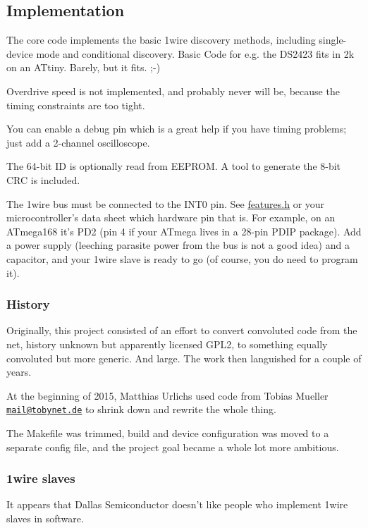 \subsection*{Implementation}

The core code implements the basic 1wire discovery methods, including single-\/device mode and conditional discovery. Basic Code for e.\-g. the D\-S2423 fits in 2k on an A\-Ttiny. Barely, but it fits. ;-\/)

Overdrive speed is not implemented, and probably never will be, because the timing constraints are too tight.

You can enable a debug pin which is a great help if you have timing problems; just add a 2-\/channel oscilloscope.

The 64-\/bit I\-D is optionally read from E\-E\-P\-R\-O\-M. A tool to generate the 8-\/bit C\-R\-C is included.

The 1wire bus must be connected to the I\-N\-T0 pin. See {\ttfamily \hyperlink{features_8h}{features.\-h}} or your microcontroller's data sheet which hardware pin that is. For example, on an A\-Tmega168 it's P\-D2 (pin 4 if your A\-Tmega lives in a 28-\/pin P\-D\-I\-P package). Add a power supply (leeching parasite power from the bus is not a good idea) and a capacitor, and your 1wire slave is ready to go (of course, you do need to program it).

\subsubsection*{History}

Originally, this project consisted of an effort to convert convoluted code from the net, history unknown but apparently licensed G\-P\-L2, to something equally convoluted but more generic. And large. The work then languished for a couple of years.

At the beginning of 2015, Matthias Urlichs used code from Tobias Mueller \href{mailto:mail@tobynet.de}{\tt mail@tobynet.\-de} to shrink down and rewrite the whole thing.

The Makefile was trimmed, build and device configuration was moved to a separate config file, and the project goal became a whole lot more ambitious.

\subsubsection*{1wire slaves}

It appears that Dallas Semiconductor doesn't like people who implement 1wire slaves in software.

